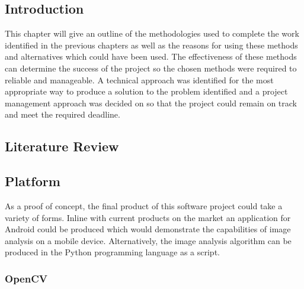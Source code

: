 \subsection{Introduction}
	This chapter will give an outline of the methodologies used to complete the work identified in the previous chapters as well as the reasons for using these methods and alternatives which could have been used. The effectiveness of these methods can determine the success of the project so the chosen methods were required to reliable and manageable. A technical approach was identified for the most appropriate way to produce a solution to the problem identified and a project management approach was decided on so that the project could remain on track and meet the required deadline.
\subsection{Literature Review}
\subsection{Platform}
	As a proof of concept, the final product of this software project could take a variety of forms. Inline with current products on the market an application for Android could be produced which would demonstrate the capabilities of image analysis on a mobile device. Alternatively, the image analysis algorithm can be produced in the Python programming language as a script.
	\subsubsection{OpenCV}
